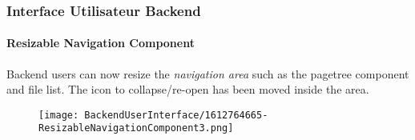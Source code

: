%

\begin{frame}[fragile]
	\frametitle{Interface Utilisateur Backend}
	\framesubtitle{Resizable Navigation Component}

	Backend users can now resize the \textit{navigation area} such as the pagetree
	component and file list. The icon to collapse/re-open has been moved inside
	the area.

	\begin{figure}
		\texttt{[image: BackendUserInterface/1612764665-ResizableNavigationComponent3.png]}
	\end{figure}

\end{frame}

